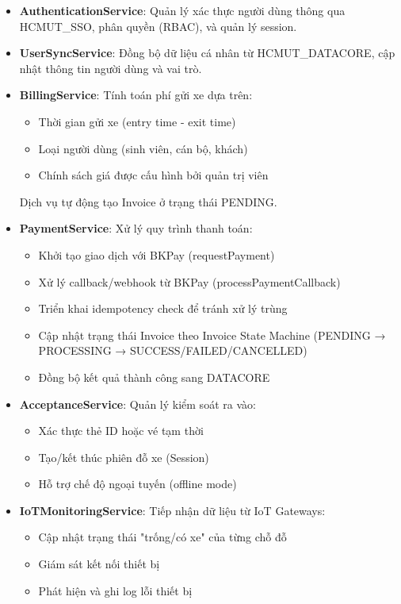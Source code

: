 \begin{itemize}
    \item \textbf{AuthenticationService}: Quản lý xác thực người dùng thông qua HCMUT\_SSO, phân quyền (RBAC), và quản lý session.
    
    \item \textbf{UserSyncService}: Đồng bộ dữ liệu cá nhân từ HCMUT\_DATACORE, cập nhật thông tin người dùng và vai trò.
    
    \item \textbf{BillingService}: Tính toán phí gửi xe dựa trên:
    \begin{itemize}
        \item Thời gian gửi xe (entry time - exit time)
        \item Loại người dùng (sinh viên, cán bộ, khách)
        \item Chính sách giá được cấu hình bởi quản trị viên
    \end{itemize}
    Dịch vụ tự động tạo Invoice ở trạng thái PENDING.
    
    \item \textbf{PaymentService}: Xử lý quy trình thanh toán:
    \begin{itemize}
        \item Khởi tạo giao dịch với BKPay (requestPayment)
        \item Xử lý callback/webhook từ BKPay (processPaymentCallback)
        \item Triển khai idempotency check để tránh xử lý trùng
        \item Cập nhật trạng thái Invoice theo Invoice State Machine (PENDING → PROCESSING → SUCCESS/FAILED/CANCELLED)
        \item Đồng bộ kết quả thành công sang DATACORE
    \end{itemize}
    
    \item \textbf{AcceptanceService}: Quản lý kiểm soát ra vào:
    \begin{itemize}
        \item Xác thực thẻ ID hoặc vé tạm thời
        \item Tạo/kết thúc phiên đỗ xe (Session)
        \item Hỗ trợ chế độ ngoại tuyến (offline mode)
    \end{itemize}
    
    \item \textbf{IoTMonitoringService}: Tiếp nhận dữ liệu từ IoT Gateways:
    \begin{itemize}
        \item Cập nhật trạng thái "trống/có xe" của từng chỗ đỗ
        \item Giám sát kết nối thiết bị
        \item Phát hiện và ghi log lỗi thiết bị
    \end{itemize}
    

\end{itemize}
